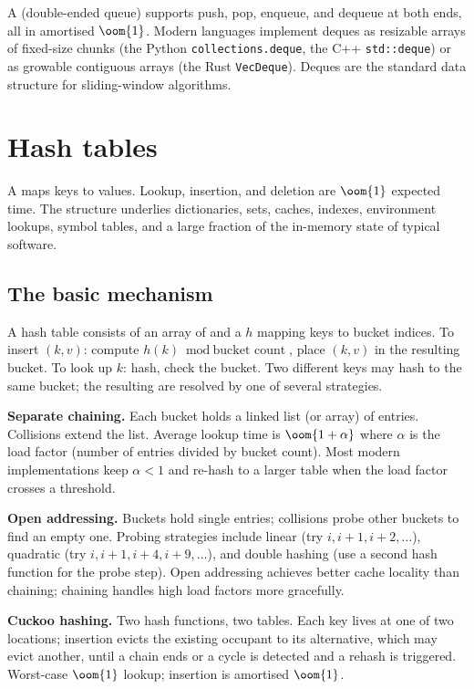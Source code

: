 A  (double-ended queue) supports push, pop, enqueue, and dequeue at both ends, all in amortised $\oom{1}$. Modern languages implement deques as resizable arrays of fixed-size chunks (the Python \texttt{collections.deque}, the C++ \texttt{std::deque}) or as growable contiguous arrays (the Rust \texttt{VecDeque}). Deques are the standard data structure for sliding-window algorithms.

\section{Hash tables}

A  maps keys to values. Lookup, insertion, and deletion are $\oom{1}$ expected time. The structure underlies dictionaries, sets, caches, indexes, environment lookups, symbol tables, and a large fraction of the in-memory state of typical software.

\subsection{The basic mechanism}

A hash table consists of an array of  and a  $h$ mapping keys to bucket indices. To insert $(k, v)$: compute $h(k) \bmod \text{bucket count}$, place $(k, v)$ in the resulting bucket. To look up $k$: hash, check the bucket. Two different keys may hash to the same bucket; the resulting  are resolved by one of several strategies.

\textbf{Separate chaining.} Each bucket holds a linked list (or array) of entries. Collisions extend the list. Average lookup time is $\oom{1 + \alpha}$ where $\alpha$ is the load factor (number of entries divided by bucket count). Most modern implementations keep $\alpha < 1$ and re-hash to a larger table when the load factor crosses a threshold.

\textbf{Open addressing.} Buckets hold single entries; collisions probe other buckets to find an empty one. Probing strategies include linear (try $i, i+1, i+2, \ldots$), quadratic (try $i, i+1, i+4, i+9, \ldots$), and double hashing (use a second hash function for the probe step). Open addressing achieves better cache locality than chaining; chaining handles high load factors more gracefully.

\textbf{Cuckoo hashing.} Two hash functions, two tables. Each key lives at one of two locations; insertion evicts the existing occupant to its alternative, which may evict another, until a chain ends or a cycle is detected and a rehash is triggered. Worst-case $\oom{1}$ lookup; insertion is amortised $\oom{1}$.

